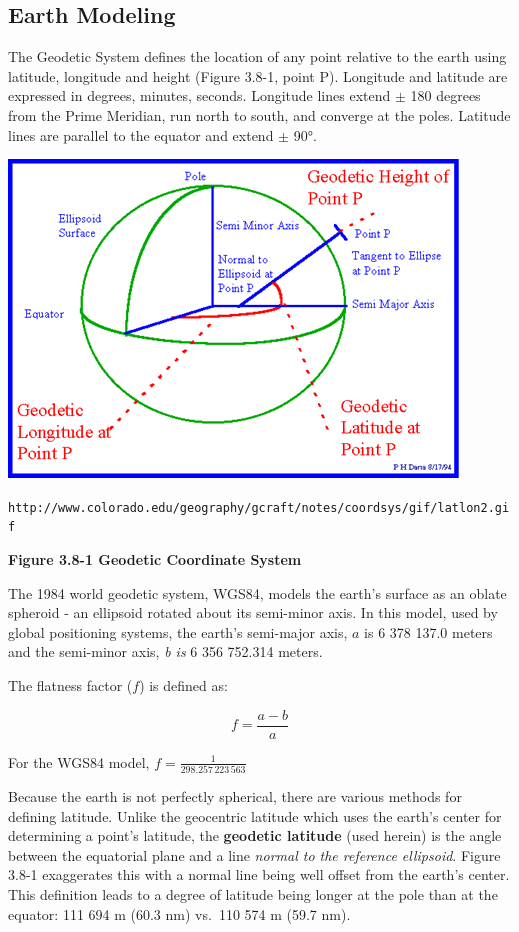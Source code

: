 \documentclass[
]{book}
\begin{document}
\hypertarget{earth-modeling}{%
\subsection*{Earth Modeling}\label{earth-modeling}}

The Geodetic System defines the location of any point relative to the earth using latitude, longitude and height (Figure 3.8-1, point P). Longitude and latitude are expressed in degrees, minutes, seconds. Longitude lines extend \(\pm\) 180 degrees from the Prime Meridian, run north to south, and converge at the poles. Latitude lines are parallel to the equator and extend \(\pm\) 90°.

\includegraphics[width=4.71665in,height=3.32292in]{media/03/image29.png}

\texttt{http://www.colorado.edu/geography/gcraft/notes/coordsys/gif/latlon2.gif}

\textbf{Figure 3.8-1 Geodetic Coordinate System}

The 1984 world geodetic system, WGS84, models the earth's surface as an oblate spheroid - an ellipsoid rotated about its semi-minor axis. In this model, used by global positioning systems, the earth's semi-major axis, \(a\) is 6 378 137.0 meters and the semi-minor axis, \emph{b is} 6 356 752.314 meters.

The flatness factor (\(f\)) is defined as:

\[f = \frac{a - b}{a}\]

For the WGS84 model, \(f = \frac{1}{298.257\,223\,563}\)

Because the earth is not perfectly spherical, there are various methods for defining latitude. Unlike the geocentric latitude which uses the earth's center for determining a point's latitude, the \textbf{geodetic latitude} (used herein) is the angle between the equatorial plane and a line \emph{normal to the reference ellipsoid}. Figure 3.8-1 exaggerates this with a normal line being well offset from the earth's center. This definition leads to a degree of latitude being longer at the pole than at the equator: 111 694 m (60.3 nm) vs.~110 574 m (59.7 nm).
\end{document}
